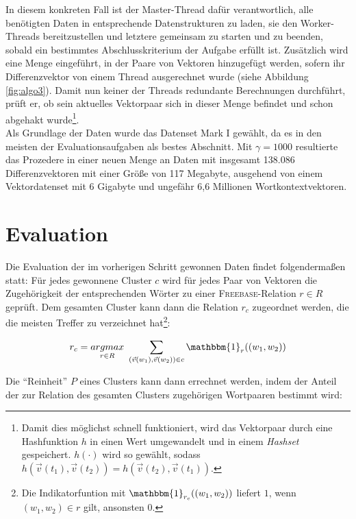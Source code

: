 In diesem konkreten Fall ist der Master-Thread dafür verantwortlich, alle benötigten Daten in entsprechende Datenstrukturen
zu laden, sie den Worker-Threads bereitzustellen und letztere gemeinsam zu starten und zu beenden, sobald ein bestimmtes
Abschlusskriterium der Aufgabe erfüllt ist.
Zusätzlich wird eine Menge eingeführt, in der Paare von Vektoren hinzugefügt werden, sofern
ihr Differenzvektor von einem Thread ausgerechnet wurde (siehe Abbildung \ref{fig:algo3}). Damit nun keiner der Threads redundante Berechnungen durchführt, prüft er, ob sein
aktuelles Vektorpaar sich in dieser Menge befindet und schon abgehakt wurde\footnote{Damit dies möglichst schnell funktioniert,
wird das Vektorpaar durch eine Hashfunktion $h$ in einen Wert umgewandelt und in einem \emph{Hashset} gespeichert. $h(\cdot)$ wird so gewählt,
sodass $h(\vec{v}(t_1), \vec{v}(t_2)) = h(\vec{v}(t_2), \vec{v}(t_1))$.}.\\

Als Grundlage der Daten wurde das Datenset Mark I gewählt, da es in den meisten der Evaluationsaufgaben
als bestes Abschnitt. Mit $\gamma = 1000$ resultierte das Prozedere in einer neuen Menge an Daten mit insgesamt
138.086 Differenzvektoren mit einer Größe von 117 Megabyte, ausgehend von einem Vektordatenset mit 6 Gigabyte und
ungefähr 6,6 Millionen Wortkontextvektoren.\\

\section{Evaluation}

Die Evaluation der im vorherigen Schritt gewonnen Daten findet folgendermaßen statt: Für jedes gewonnene Cluster $c$ wird für
jedes Paar von Vektoren die Zugehörigkeit der entsprechenden Wörter zu einer \textsc{Freebase}-Relation $r \in R$ geprüft.
Dem gesamten Cluster kann dann die Relation $r_c$ zugeordnet werden, die die meisten Treffer zu verzeichnet hat\footnote{Die Indikatorfuntion mit $\mathbbm{1}_{r_c}((w_1, w_2))$ liefert $1$, wenn
$(w_1, w_2) \in r$ gilt, ansonsten $0$.}:

\begin{equation}
    r_c = \underset{r \in R}{argmax}\ \sum_{(\vec{v}(w_1), \vec{v}(w_2)) \in c}  \mathbbm{1}_{r}((w_1, w_2))
\end{equation}

Die ``Reinheit'' $P$ eines Clusters kann dann errechnet werden, indem der Anteil der zur Relation des gesamten Clusters
zugehörigen Wortpaaren bestimmt wird:

